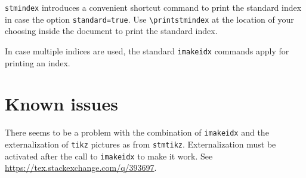 \documentclass[%
  type=article,%
  layout=koma,%
  date=true,%
  hyperref=true,%
  index=false,%
  listings=true%
]{stmtext}
\begin{document}
\texttt{stmindex} introduces a convenient shortcut command to print the standard index in case the option \texttt{standard=true}. Use \verb+\printstmindex+ at the location of your choosing inside the document to print the standard index.

In case multiple indices are used, the standard \texttt{imakeidx} commands apply for printing an index.

\section{Known issues}

There seems to be a problem with the combination of \texttt{imakeidx} and the externalization of \texttt{tikz} pictures as from \texttt{stmtikz}. Externalization must be activated after the call to \texttt{imakeidx} to make it work. See \url{https://tex.stackexchange.com/q/393697}.








\end{document}
